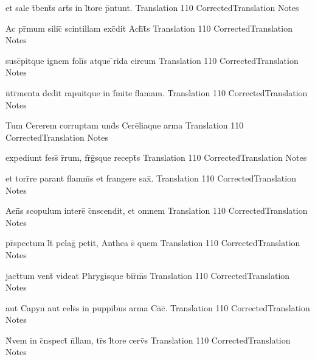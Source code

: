 \documentclass[]{book}
\begin{document}
\latline
  {et sale t\={}bent\={\macron {\i}}s art\={}s in l\={\macron {\i}}tore p\={}ntunt.}
  { Translation }
  {110}
  { CorrectedTranslation }
  { Notes }


\latline
  {Ac pr\={\macron {\i}}mum silic\={\macron {\i}} scintillam exc\={}dit Ach\={}t\={}s}
  { Translation }
  {110}
  { CorrectedTranslation }
  { Notes }



\latline
  {susc\={}pitque ignem foli\={\macron {\i}}s atque \={}rida circum}
  { Translation }
  {110}
  { CorrectedTranslation }
  { Notes }


\latline
  {n\={}tr\={\macron {\i}}menta dedit rapuitque in f\={}mite flamam.}
  { Translation }
  {110}
  { CorrectedTranslation }
  { Notes }


\latline
  {Tum Cererem corruptam und\={\macron {\i}}s Cere\={}liaque arma}
  { Translation }
  {110}
  { CorrectedTranslation }
  { Notes }



\latline
  {expediunt fess\={\macron {\i}} r\={}rum, fr\={}g\={}sque recept\={}s}
  { Translation }
  {110}
  { CorrectedTranslation }
  { Notes }


\latline
  {et torr\={}re parant flamm\={\macron {\i}}s et frangere sax\={}.}
  { Translation }
  {110}
  { CorrectedTranslation }
  { Notes }


\latline
  {Aen\={}\={}s scopulum intere\={} c\={}nscendit, et omnem}
  { Translation }
  {110}
  { CorrectedTranslation }
  { Notes }



\latline
  {pr\={}spectum l\={}t\={} pelag\={} petit, Anthea s\={\macron {\i}} quem}
  { Translation }
  {110}
  { CorrectedTranslation }
  { Notes }


\latline
  {jact\={}tum vent\={} videat Phrygi\={}sque bir\={}m\={\macron {\i}}s}
  { Translation }
  {110}
  { CorrectedTranslation }
  { Notes }


\latline
  {aut Capyn aut cels\={\macron {\i}}s in puppibus arma Ca\={\macron {\i}}c\={\macron {\i}}.}
  { Translation }
  {110}
  { CorrectedTranslation }
  { Notes }



\latline
  {N\={}vem in c\={}nspect\={} n\={}llam, tr\={\macron {\i}}s l\={\macron {\i}}tore cerv\={}s}
  { Translation }
  {110}
  { CorrectedTranslation }
  { Notes }
\end{document}
